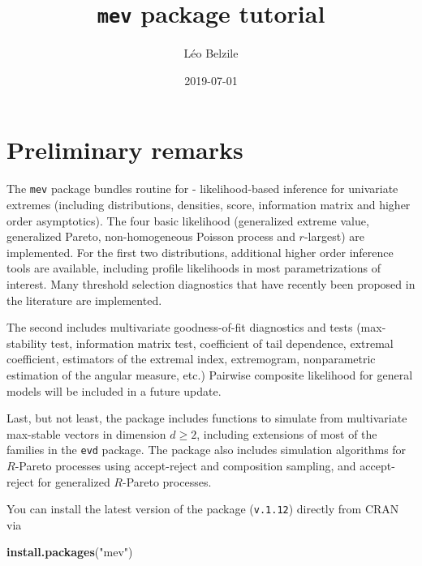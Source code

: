 \documentclass[]{book}
\title{\texttt{mev} package tutorial}
\author{Léo Belzile}
\date{2019-07-01}
\newenvironment{Shaded}{\begin{snugshade}}{\end{snugshade}}
\newcommand{\KeywordTok}[1]{\textcolor[rgb]{0.13,0.29,0.53}{\textbf{#1}}}
\newcommand{\NormalTok}[1]{#1}
\newcommand{\StringTok}[1]{\textcolor[rgb]{0.31,0.60,0.02}{#1}}
\begin{document}
\maketitle

{
\setcounter{tocdepth}{1}
\tableofcontents
}
\hypertarget{preliminary-remarks}{%
\chapter*{Preliminary remarks}\label{preliminary-remarks}}

The \texttt{mev} package bundles routine for
- likelihood-based inference for univariate extremes (including distributions, densities, score, information matrix and higher order asymptotics). The four basic likelihood (generalized extreme value, generalized Pareto, non-homogeneous Poisson process and \(r\)-largest) are implemented. For the first two distributions, additional higher order inference tools are available, including profile likelihoods in most parametrizations of interest. Many threshold selection diagnostics that have recently been proposed in the literature are implemented.

The second includes multivariate goodness-of-fit diagnostics and tests (max-stability test, information matrix test, coefficient of tail dependence, extremal coefficient, estimators of the extremal index, extremogram, nonparametric estimation of the angular measure, etc.) Pairwise composite likelihood for general models will be included in a future update.

Last, but not least, the package includes functions to simulate from multivariate max-stable vectors in dimension \(d\geq 2\), including extensions of most of the families in the \texttt{evd} package. The package also includes simulation algorithms for \(R\)-Pareto processes using accept-reject and composition sampling, and accept-reject for generalized \(R\)-Pareto processes.

You can install the latest version of the package (\texttt{v.1.12}) directly from CRAN via

\begin{Shaded}
\begin{Highlighting}[]
\KeywordTok{install.packages}\NormalTok{(}\StringTok{"mev"}\NormalTok{)}
\end{Highlighting}
\end{Shaded}
\end{document}

